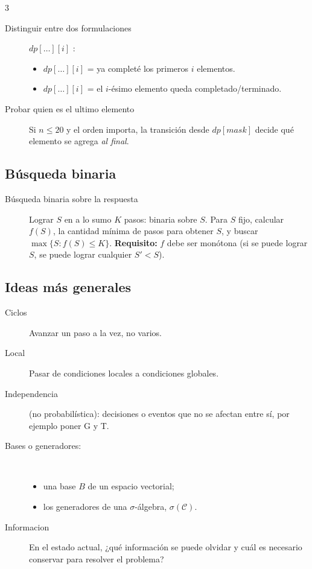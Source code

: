 \documentclass[8pt, spanish, mexico, letterpaper]{extarticle}
\newcommand{\<}{<}
\begin{document}
\begin{multicols*}{3}
\begin{description}
\item[Distinguir entre dos formulaciones]
  $dp[\dots][i]$ :
  \begin{itemize}
    \item $dp[\dots][i]$ = ya completé los primeros $i$ elementos.
    \item $dp[\dots][i]$ = el $i$-ésimo elemento queda completado/terminado.
  \end{itemize}

\item[Probar quien es el ultimo elemento]
  Si $n \le 20$ y el orden importa, la transición desde $dp[mask]$ decide qué elemento se agrega \emph{al final}.
\end{description}


\subsection{Búsqueda binaria}
\begin{description}
\item[Búsqueda binaria sobre la respuesta]
  Lograr $S$ en a lo sumo $K$ pasos: binaria sobre $S$. Para $S$ fijo, calcular $f(S)$, la cantidad mínima de pasos para obtener $S$, y buscar $\max\{S : f(S) \le K\}$.
  \textbf{Requisito:} $f$ debe ser monótona (si se puede lograr $S$, se puede lograr cualquier $S' < S$).
\end{description}

\subsection{Ideas más generales}
\begin{description}
    \item[Ciclos] Avanzar un paso a la vez, no varios.
    \item[Local] Pasar de condiciones locales a condiciones globales.
    \item[Independencia]  (no probabilística): decisiones o eventos que no se afectan entre sí, por ejemplo poner G y T.
    \item[Bases o generadores:]  \textcolor{white}{.}
      \begin{itemize}
        \item una base $B$ de un espacio vectorial;
        \item los generadores de una $\sigma$-álgebra, $\sigma(\mathcal{C})$.
      \end{itemize}
    \item[Informacion] En el estado actual, ¿qué información se puede olvidar y cuál es necesario conservar para resolver el problema?
\end{description}


\end{multicols*}
\end{document}
